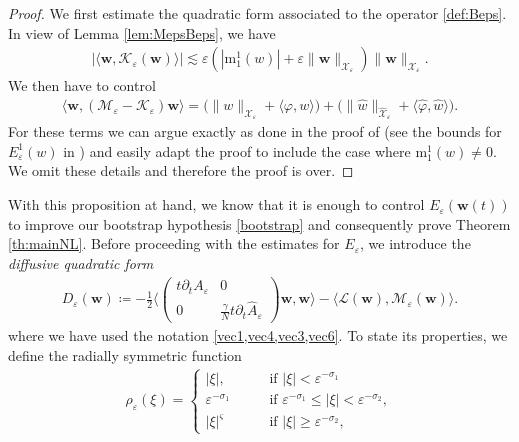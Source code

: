 \documentclass[11pt,reqno,a4paper]{amsart}
\def\eps{\varepsilon}
\def\de{{\partial}}
\newcommand{\cK}{\mathcal{K}}
\newcommand{\cL}{\mathcal{L}}
\newcommand{\cM}{\mathcal{M}}
\newcommand{\cX}{\mathcal{X}}
\newcommand{\mrm}{\mathrm{m}}
\newcommand{\1}{\mathbbm{1}}
\theoremstyle{definition}
\theoremstyle{definition}
\numberwithin{equation}{section}
\begin{document}
\begin{proof}
    We first   estimate the quadratic form associated to the operator \cref{def:Beps}.
In view of Lemma \ref{lem:MepsBeps}, we have \begin{align}
\label{bd:wBw}
     |\langle {\mathbf w},\cK_\eps({\mathbf w})\rangle|\lesssim \eps(|\mrm^1_1(w)|+\eps\|{\mathbf w}\|_{\boldsymbol{\cX}_\eps})\|{\mathbf w}\|_{\boldsymbol{\cX}_\eps}.
 \end{align}
 We then have to control 
  \begin{align}
     \langle {\mathbf w},(\cM_\eps-\cK_\eps){\mathbf w}\rangle=\big(\|w\|_{\cX_\eps}+\langle \varphi,w\rangle\big)+\big(\|\widehat{w}\|_{\widehat{\cX}_\eps}+\langle \widehat{\varphi},\widehat{w}\rangle\big).
 \end{align}
For these terms we can argue exactly as done in the proof of \cite[Proposition 4.9]{dolce2024long} (see the bounds for  $E_\eps^1(w)$ in \cite[Proposition 4.9]{dolce2024long}) and easily adapt the proof to include the case where $\mrm^1_1(w)\neq 0$. We omit these details and therefore the proof is over.
 \end{proof}
With this proposition at hand, we know that it is enough to control  $E_\eps({\mathbf w}(t))$ to improve our bootstrap hypothesis \cref{bootstrap} and consequently prove Theorem \ref{th:mainNL}. Before proceeding with the estimates for $E_\eps$, we introduce the \emph{diffusive quadratic form}
 \begin{align}
 \label{def:Deps}
     D_{\eps}({\mathbf w})\coloneqq -\frac12\Big\langle \begin{pmatrix}
         t\de_t A_\eps & 0\\
         0 &\frac{\gamma}{N}t\de_t \widehat{A}_\eps
     \end{pmatrix}{\mathbf w},{\mathbf w}\Big\rangle-\langle \cL({\mathbf w}),\cM_{\eps}({\mathbf w})\rangle.
 \end{align} 
 where we have used the notation \cref{vec1,vec4,vec3,vec6}.
 To state its properties, we define the radially symmetric function 
\begin{align}
    \rho_\eps(\xi)=\begin{cases}
        |\xi|, \qquad &\text{if }|\xi|<\eps^{-\sigma_1}\\
        \eps^{-\sigma_1}\qquad &\text{if }\eps^{-\sigma_1}\leq |\xi|<\eps^{-\sigma_2},\\
        |\xi|^{\varsigma} \qquad &\text{if }|\xi|\geq \eps^{-\sigma_2},
    \end{cases}
\end{align}
\end{document}
